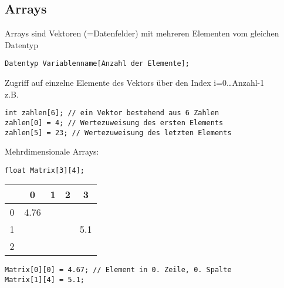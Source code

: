\subsection{Arrays}
Arrays sind Vektoren (=Datenfelder) mit mehreren Elementen vom gleichen Datentyp
\begin{lstlisting}
Datentyp Variablenname[Anzahl der Elemente];
\end{lstlisting}
Zugriff auf einzelne Elemente des Vektors über den Index i=0\dots Anzahl-1 \\
z.B.
\begin{lstlisting}
int zahlen[6]; // ein Vektor bestehend aus 6 Zahlen
zahlen[0] = 4; // Wertezuweisung des ersten Elements
zahlen[5] = 23; // Wertezuweisung des letzten Elements
\end{lstlisting}
Mehrdimensionale Arrays:
\begin{lstlisting}
float Matrix[3][4];
\end{lstlisting}
\begin{table}[h]
\begin{center}
\begin{tabular}{c|c|c|c|c}
~ & 0 & 1 & 2 & 3 \\
\hline
0 & 4.76 & ~& ~&~\\
1 & ~& ~& ~&5.1\\
2 & ~& ~& ~&~\\
\end{tabular}
\end{center}
\end{table}
\begin{lstlisting}
Matrix[0][0] = 4.67; // Element in 0. Zeile, 0. Spalte
Matrix[1][4] = 5.1;
\end{lstlisting}